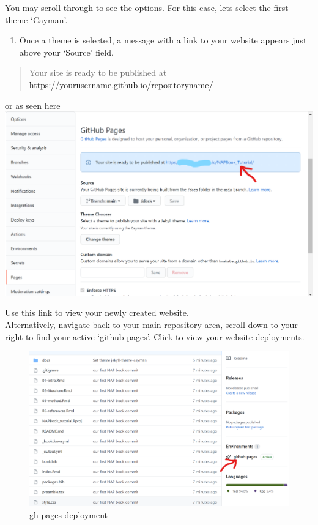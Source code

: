 \documentclass[
]{book}
\providecommand{\tightlist}{%
  \setlength{\itemsep}{0pt}\setlength{\parskip}{0pt}}
\begin{document}
You may scroll through to see the options. For this case, lets select the first theme `Cayman'.

\begin{enumerate}
\def\labelenumi{\arabic{enumi}.}
\setcounter{enumi}{3}
\tightlist
\item
  Once a theme is selected, a message with a link to your website appears just above your `Source' field.
\end{enumerate}

\begin{quote}
Your site is ready to be published at \url{https://yourusername.github.io/repositoryname/}
\end{quote}

or as seen here \includegraphics{tutorial_screenshots/gh_pageslink.png}

Use this link to view your newly created website.\\
Alternatively, navigate back to your main repository area, scroll down to your right to find your active `github-pages'. Click to view your website deployments.

\begin{figure}
\centering
\includegraphics{tutorial_screenshots/gh_pages_deploy.png}
\caption{gh pages deployment}
\end{figure}
\end{document}
